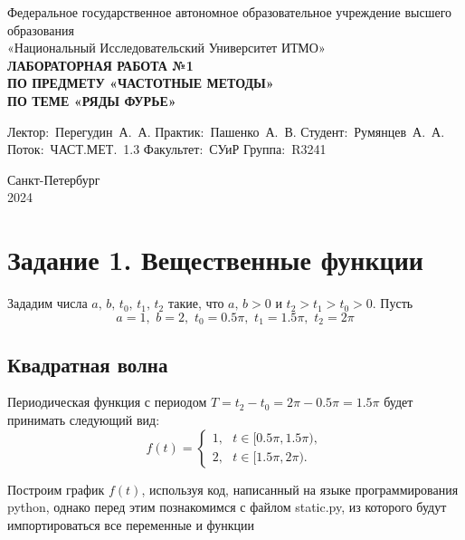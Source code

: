 \documentclass[a4paper, 16pt]{article}
\begin{document}
\begin{titlepage}

\begin{center}
\vfill

Федеральное государственное автономное образовательное учреждение высшего образования\\
«Национальный Исследовательский Университет ИТМО»\ \\

\vfill
{\large\bf ЛАБОРАТОРНАЯ РАБОТА №1\\
    ПО ПРЕДМЕТУ «ЧАСТОТНЫЕ МЕТОДЫ»\\
    ПО ТЕМЕ «РЯДЫ ФУРЬЕ»}
\vfill
    
\begin{flushright}
    \begin{minipage}{.45\textwidth}
    {
        \hbox{Лектор: Перегудин А. А.}
        \hbox{Практик: Пашенко А. В.}
        \hbox{Студент: Румянцев А. А.}
        \hbox{Поток: ЧАСТ.МЕТ. 1.3}
        \hbox{}
        \hbox{Факультет: СУиР}
        \hbox{Группа: R3241}
    }
    \end{minipage}
\end{flushright}

\vfill
        
Санкт-Петербург\\
2024
\end{center}
\end{titlepage}
\setlength{\parskip}{1.5mm}

\tableofcontents

\newpage
\section{Задание 1. Вещественные функции}


Зададим числа $a,\,b,\,t_0,\,t_1,\,t_2$ такие, что $a,\,b > 0$ и $t_2 > t_1 > t_0 > 0$. Пусть
$$a=1,\,\,b=2,\,\,t_0=0.5\pi,\,\,t_1=1.5\pi,\,\,t_2=2\pi$$

\subsection{Квадратная волна}
Периодическая функция с периодом $T=t_2-t_0=2\pi-0.5\pi=1.5\pi$ будет принимать следующий вид:
$$
f(t)=
\begin{cases}
    1,\,\,\,\,t\in [0.5\pi, 1.5\pi),\\
    2,\,\,\,\,t\in [1.5\pi, 2\pi).
\end{cases}
$$


\noindent Построим график $f(t)$, используя код, написанный на языке программирования python,
однако перед этим познакомимся с файлом static.py, из которого будут импортироваться все
переменные и функции
\end{document}
